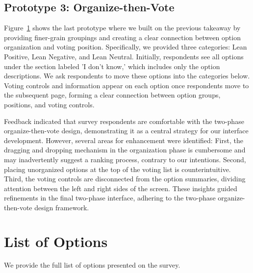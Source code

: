 \begin{figure}[ht]
    \label{fig:qv_org}
\end{figure}

\subsection{Prototype 3: Organize-then-Vote}
Figure~\ref{fig:qv_org} shows the last prototype where we built on the previous takeaway by providing finer-grain groupings and creating a clear connection between option organization and voting position. Specifically, we provided three categories: Lean Positive, Lean Negative, and Lean Neutral. Initially, respondents see all options under the section labeled 'I don't know,' which includes only the option descriptions. We ask respondents to move these options into the categories below. Voting controls and information appear on each option once respondents move to the subsequent page, forming a clear connection between option groups, positions, and voting controls.

Feedback indicated that survey respondents are comfortable with the two-phase organize-then-vote design, demonstrating it as a central strategy for our interface development. However, several areas for enhancement were identified: First, the dragging and dropping mechanism in the organization phase is cumbersome and may inadvertently suggest a ranking process, contrary to our intentions. Second, placing unorganized options at the top of the voting list is counterintuitive. Third, the voting controls are disconnected from the option summaries, dividing attention between the left and right sides of the screen. These insights guided refinements in the final two-phase interface, adhering to the two-phase organize-then-vote design framework.

\section{List of Options}
\label{sec:charityList}
We provide the full list of options presented on the survey.

